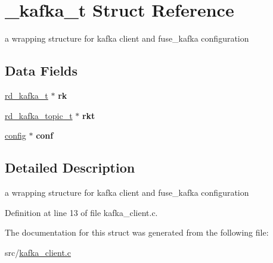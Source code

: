 \hypertarget{struct__kafka__t}{\section{\-\_\-kafka\-\_\-t Struct Reference}
\label{struct__kafka__t}
}


a wrapping structure for kafka client and fuse\-\_\-kafka configuration  


\subsection*{Data Fields}
\begin{DoxyCompactItemize}
\item 
\hypertarget{struct__kafka__t_aadfd0b7995597661f726186c612898cb}{\hyperlink{structrd__kafka__t}{rd\-\_\-kafka\-\_\-t} $\ast$ {\bfseries rk}}\label{struct__kafka__t_aadfd0b7995597661f726186c612898cb}

\item 
\hypertarget{struct__kafka__t_a9204605d0405df090d6b394803dc771a}{\hyperlink{structrd__kafka__topic__t}{rd\-\_\-kafka\-\_\-topic\-\_\-t} $\ast$ {\bfseries rkt}}\label{struct__kafka__t_a9204605d0405df090d6b394803dc771a}

\item 
\hypertarget{struct__kafka__t_a192c14b391375fc4a980ab933bee9d73}{\hyperlink{fuse__kafka_8c_aa75d2304f2d943e86dadbe603a750c9d}{config} $\ast$ {\bfseries conf}}\label{struct__kafka__t_a192c14b391375fc4a980ab933bee9d73}

\end{DoxyCompactItemize}


\subsection{Detailed Description}
a wrapping structure for kafka client and fuse\-\_\-kafka configuration 

Definition at line 13 of file kafka\-\_\-client.\-c.



The documentation for this struct was generated from the following file\-:\begin{DoxyCompactItemize}
\item 
src/\hyperlink{kafka__client_8c}{kafka\-\_\-client.\-c}\end{DoxyCompactItemize}
